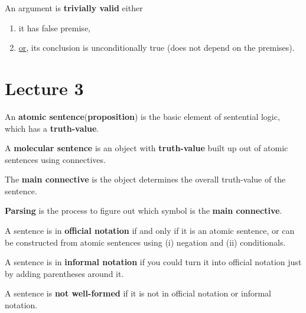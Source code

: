 \documentclass[11pt]{article}
\begin{document}
		\begin{definition}
			An argument is \textbf{trivially valid} either
			\begin{enumerate}
				\item it has false premise,
				\item \ul{or}, its conclusion is unconditionally true (does not depend on the premises).
			\end{enumerate}
		\end{definition}
	
	\section{Lecture 3}
		\begin{definition}
			An \textbf{atomic sentence}(\textbf{proposition}) is the basic element of sentential logic, which has a \textbf{truth-value}.
		\end{definition}
		
		\begin{definition}
			A \textbf{molecular sentence} is an object with \textbf{truth-value} built up out of atomic sentences using connectives.
		\end{definition}
		
		\begin{definition}
			The \textbf{main connective} is the object determines the overall truth-value of the sentence.
		\end{definition}
		
		\begin{definition}
			\textbf{Parsing} is the process to figure out which symbol is the \textbf{main connective}.
		\end{definition}
		
		\begin{definition}
			A sentence is in \textbf{official notation} if and only if it is an atomic sentence, or can be constructed from atomic sentences using (i) negation and (ii) conditionals.
		\end{definition}
		
		\begin{definition}
			A sentence is in \textbf{informal notation} if you could turn it into official notation just by adding parentheses around it.
		\end{definition}
		
		\begin{definition}
			A sentence is \textbf{not well-formed} if it is not in official notation or informal notation.
		\end{definition}
		
\end{document}
